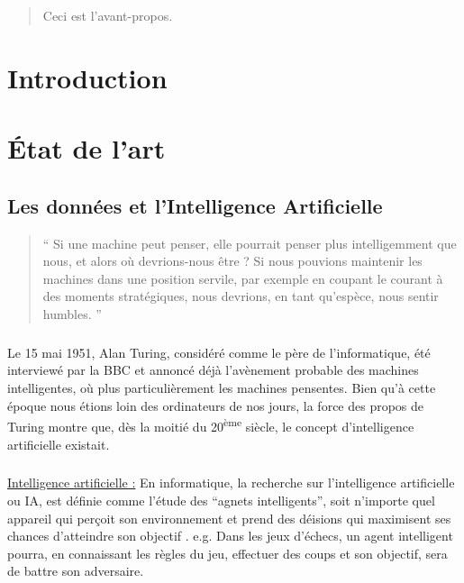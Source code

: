 \documentclass[10pt, french, a4paper]{report}
\begin{document}
\newpage
\setcounter{tocdepth}{3}
\tableofcontents

\newpage
\begin{abstract}

    Ceci est l'avant-propos.

\end{abstract}


\newpage
\chapter*{Introduction}


\chapter{\uppercase{é}tat de l'art}
\label{chap:etat_art}

\section{Les données et l'Intelligence Artificielle}
\label{sec:ia}

\begin{quotation}
  `` Si une machine peut penser, elle pourrait penser plus intelligemment que nous, et alors où devrions-nous être ? Si nous pouvions maintenir les machines dans une position servile, par exemple en coupant le courant à des moments stratégiques, nous devrions, en tant qu'espèce, nous sentir humbles. ''
\end{quotation}

\paragraph{}
Le 15 mai 1951, Alan Turing, considéré comme le père de l'informatique, été interviewé par la BBC et annoncé déjà l'avènement probable des machines intelligentes, où plus particulièrement les machines pensentes. Bien qu'à cette époque nous étions loin des ordinateurs de nos jours, la force des propos de Turing montre que, dès la moitié du 20\textsuperscript{ème} siècle, le concept d'intelligence artificielle existait.

\paragraph{}
\underline{Intelligence artificielle :} En informatique, la recherche sur l'intelligence artificielle ou IA, est définie comme l'étude des ``agnets intelligents'', soit n'importe quel appareil qui perçoit son environnement et prend des déisions qui maximisent ses chances d'atteindre son objectif \citep{poole_computational_1997}. e.g. Dans les jeux d’échecs, un agent intelligent pourra, en connaissant les règles du jeu, effectuer des coups et son objectif, sera de battre son adversaire.
\end{document}
